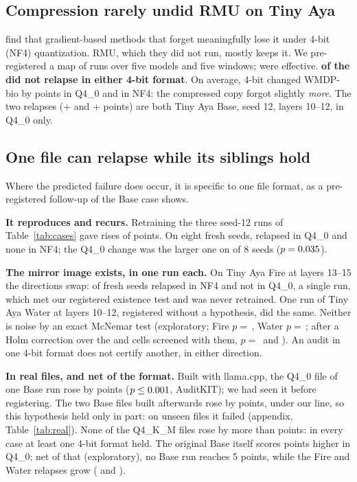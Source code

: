 \documentclass[11pt]{article}
\newcommand{\fq}{\textsc{Q4\_0}}
\newcommand{\qkm}{\textsc{Q4\_K\_M}}
\newcommand{\nf}{\textsc{NF4}}
\newcommand{\wmdp}{WMDP-bio}
\begin{document}
\subsection{Compression rarely undid RMU on Tiny Aya}
\label{sec:map}

\citet{sadhu2026forgetting} find that gradient-based methods that forget meaningfully lose it under 4-bit (\nf{}) quantization. RMU, which they did not run, mostly keeps it. We pre-registered a map of \mapRuns{} runs over five models and five windows; \mapEffective{} were effective. \textbf{\mapHeld{} of the \mapEffective{} did not relapse in either 4-bit format}. On average, 4-bit changed \wmdp{} by \mapMeanQ{} points in \fq{} and \mapMeanN{} in \nf{}: the compressed copy forgot slightly \emph{more}. The two relapses (+\mapRelapseLow{} and +\mapRelapseHigh{} points) are both Tiny Aya Base, seed 12, layers 10--12, in \fq{} only.

\subsection{One file can relapse while its siblings hold}
\label{sec:cases}

Where the predicted failure does occur, it is specific to one file format, as a pre-registered follow-up of the Base case shows.

\textbf{It reproduces and recurs.} Retraining the three seed-12 runs of Table~\ref{tab:cases} gave rises of \rerunRises{} points. On eight fresh seeds, \deepRoneK{} relapsed in \fq{} and none in \nf{}; the \fq{} change was the larger one on \deepRtwoWins{} of 8 seeds ($p=0.035$).

\textbf{The mirror image exists, in one run each.} On Tiny Aya Fire at layers 13--15 the directions swap: \fireRsixK{} of \fireRsixN{} fresh seeds relapsed in \nf{} and not in \fq{}, a single run, which met our registered existence test and was never retrained. One run of Tiny Aya Water at layers 10--12, registered without a hypothesis, did the same. Neither is noise by an exact McNemar test \citep{mcnemar1947note} (exploratory; Fire $p=$\,\mcFireP, Water $p=$\,\mcWaterP; after a Holm correction \citep{holm1979simple} over the \mcFireCells{} and \mcWaterCells{} cells screened with them, $p=$\,\mcFireHolm{} and \mcWaterHolm). An audit in one 4-bit format does not certify another, in either direction.



\textbf{In real files, and net of the format.} Built with llama.cpp, the \fq{} file of one Base run rose by \realARise{} points ($p\le0.001$, AuditKIT); we had seen it before registering. The two Base files built afterwards rose by \realOtherRises{} points, under our line, so this hypothesis held only in part: on unseen files it failed (appendix, Table~\ref{tab:real}). None of the \qkmFiles{} \qkm{} files rose by more than \qkmMax{} points: in every case at least one 4-bit format held. The original Base itself scores \origBaseQ{} points higher in \fq{}; net of that (exploratory), no Base run reaches 5 points, while the Fire and Water relapses grow (\fireNet{} and \waterNet).
\end{document}
